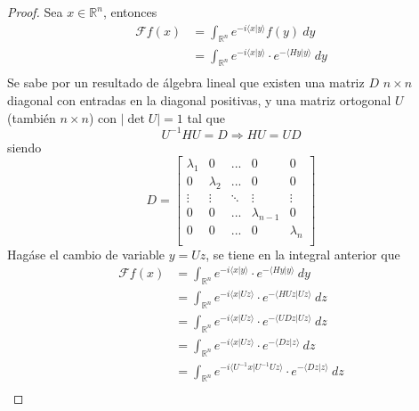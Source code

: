 \documentclass[12pt]{report}
\theoremstyle{largebreak}
\newcommand\abs[1]{\ensuremath{\left|#1\right|}}
\newcommand\pint[2]{\ensuremath{\langle#1| #2\rangle}}
\newcommand{\fou}[1]{\ensuremath{\mathcal{F}#1}}
\begin{document}
\begin{proof}
        Sea $x\in\mathbb{R}^n$, entonces
        \begin{equation*}
            \begin{split}
                \fou{f}(x)&=\int_{\mathbb{R}^n}e^{ -i\pint{x}{y}}f(y)\:dy\\
                &=\int_{\mathbb{R}^n}e^{ -i\pint{x}{y}}\cdot e^{ -\pint{Hy}{y}}\:dy\\
            \end{split}
        \end{equation*}
        Se sabe por un resultado de álgebra lineal que existen una matriz $D$ $n\times n$ diagonal con entradas en la diagonal positivas, y una matriz ortogonal $U$ (también $n\times n$) con $\abs{\det U}=1$ tal que
        \begin{equation*}
            U^{-1}HU=D\Rightarrow HU=UD
        \end{equation*}
        siendo
        \begin{equation*}
            D=\left[
                \begin{array}{ccccc}
                    \lambda_1 & 0 & ... & 0 & 0\\
                    0 & \lambda_2 & ... & 0 & 0\\
                    \vdots & \vdots & \ddots & \vdots & \vdots \\
                    0 & 0 & ... & \lambda_{ n-1} & 0\\
                    0 & 0 & ... & 0 & \lambda_n\\
                \end{array}
             \right]
        \end{equation*}
        Hagáse el cambio de variable $y=Uz$, se tiene en la integral anterior que
        \begin{equation*}
            \begin{split}
                \fou{f}(x)&=\int_{\mathbb{R}^n}e^{ -i\pint{x}{y}}\cdot e^{ -\pint{Hy}{y}}\:dy\\
                &=\int_{\mathbb{R}^n}e^{ -i\pint{x}{Uz}}\cdot e^{ -\pint{HUz}{Uz}}\:dz\\
                &=\int_{\mathbb{R}^n}e^{ -i\pint{x}{Uz}}\cdot e^{ -\pint{UDz}{Uz}}\:dz\\
                &=\int_{\mathbb{R}^n}e^{ -i\pint{x}{Uz}}\cdot e^{-\pint{Dz}{z}}\:dz\\
                &=\int_{\mathbb{R}^n}e^{ -i\pint{U^{-1}x}{U^{-1}Uz}}\cdot e^{-\pint{Dz}{z}}\:dz\\

\end{split}
\end{equation*}
\end{proof}
\end{document}
